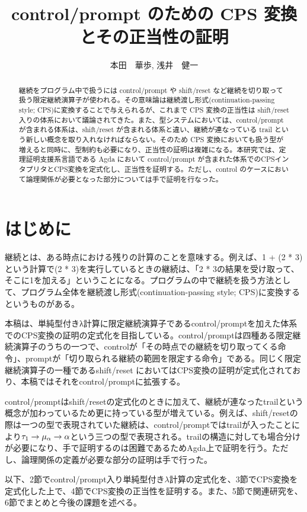 \documentclass[japanese,draft]{jssst_ppl} %
\title{control/prompt のための CPS 変換とその正当性の証明}
\author{本田　華歩, 浅井　健一}
\begin{document}
\maketitle
\begin{abstract}
継続をプログラム中で扱うには control/prompt や shift/reset など継続を切り取って扱う限定継続演算子が使われる。その意味論は継続渡し形式(continuation-passing style; CPS)に変換することで与えられるが、これまで CPS 変換の正当性は shift/reset 入りの体系において議論されてきた。また、型システムにおいては、control/prompt が含まれる体系は、shift/reset が含まれる体系と違い、継続が連なっている trail という新しい概念を取り入れなければならない。そのため CPS 変換においても扱う型が増えると同時に、型制約も必要になり、正当性の証明は複雑になる。本研究では、定理証明支援系言語である Agda において control/prompt が含まれた体系でのCPSインタプリタとCPS変換を定式化し、正当性を証明する。ただし、control のケースにおいて論理関係が必要となった部分については手で証明を行なった。
\end{abstract}

\section{はじめに}
継続とは、ある時点における残りの計算のことを意味する。例えば、1 + (2 * 3)という計算で(2 * 3)を実行しているときの継続は、「2 * 3の結果を受け取って、そこに1を加える」ということになる。プログラムの中で継続を扱う方法として、プログラム全体を継続渡し形式(continuation-passing style; CPS)に変換するというものがある。

本稿は、単純型付きλ計算に限定継続演算子であるcontrol/prompt\cite{POPL88}を加えた体系でのCPS変換の証明の定式化を目指している。control/promptは四種ある限定継続演算子のうちの一つで、controlが「その時点での継続を切り取ってくる命令」、promptが「切り取られる継続の範囲を限定する命令」である。同じく限定継続演算子の一種であるshift/reset\cite{DF1990} においてはCPS変換の証明が定式化されており、本稿ではそれをcontrol/promptに拡張する。

control/promptはshift/resetの定式化のときに加えて、継続が連なったtrailという概念が加わっているため更に持っている型が増えている。例えば、shift/resetの際は一つの型で表現されていた継続は、control/promptではtrailが入ったことにより${\tau_1}\rightarrow{{\mu_{\alpha}}\rightarrow{\alpha}}$という三つの型で表現される。trailの構造に対しても場合分けが必要になり、手で証明するのは困難であるためAgda上で証明を行う。ただし、論理関係の定義が必要な部分の証明は手で行った。

以下、2節でcontrol/prompt入り単純型付き$\lambda$計算の定式化を、3節でCPS変換を定式化した上で、4節でCPS変換の正当性を証明する。また、5節で関連研究を、6節でまとめと今後の課題を述べる。
\end{document}
